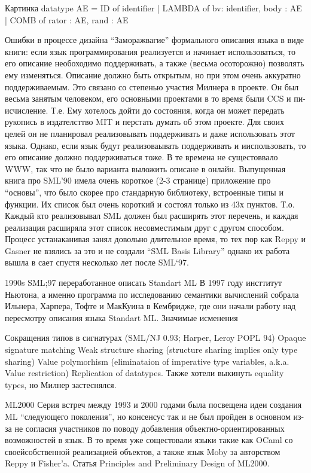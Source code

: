 \documentclass[14pt]{matmex-diploma-custom}
\begin{document}
Картинка
datatype AE = ID of identifier
            | LAMBDA of {bv: identifier, body : AE}
            | COMB of {rator : AE, rand : AE}

Ошибки в процессе дизайна
“Заморажвагие” формального описания языка в виде книги: если язык программирования реализуется и начинает использоваться, то его описание необоходимо поддерживать, а также (весьма осоторожно) позволять ему изменяться. Описание должно быть открытым, но при этом очень аккуратно поддерживаемым.
Это связано со степенью участия Милнера в проекте. Он был весьма занятым человеком, его основными проектами в то время были CCS и пи-исчисление. Т.е. Ему хотелось дойти до состояния, когда он может передать рукопись в издателсттво MIT  и перстать думать об этом проекте. Для своих целей он не планировал реализовывать поддерживать и даже использовать этот языка. Однако, если язык будут реализоваывать поддерживать и ииспользовать, то его описание должно поддерживаться тоже. В те времена не сущестоввало WWW, так что не было варианта выложить описане в онлайн.
Выпущенная книга про SML’90 имела очень короткое (2-3 странице) приложение про “основы”, что было скорее про стандарную библиотеку, встроенные типы и функции. Их список был очень короткий и состоял только из 43х пунктов. Т.о. Каждый кто реализовывал SML должен был расширять этот перечень, и каждая реализация расширяла этот список несовместимым друг с другом способом. Процесс устанаканивая занял довольно длительное время, то тех пор как Reppy и Gasner не взялись  за это и не создали “SML Basis Library” однако их работа вышла в сает спустя несколько лет после SML‘97.

1990s
SML;97 переработанное описать Standart ML
В 1997 году инсттитут Ньютона, а именно программа по исследованию семантики вычислений собрала Ильнера, Харпера, Тофте и МакКуина в Кембридже, где они начали работу над пересмотру описания языка Standart ML. Значимые исменения 


Сокращения типов в сигнатурах (SML/NJ 0.93; Harper, Leroy POPL 94)
Opaque signature matching
Weak structure sharing (structure sharing implies only type sharing) 
Value polymorhism (eliminataion of imperative type variables, a.k.a. Value restriction)
Replication of datatypes.
Также хотели выкинуть equality types, но Милнер застеснялся.

ML2000
Серия встреч между 1993 и 2000 годами была посвещена идеи создания ML “следующего поколения”,  но консенсус так и не был пройден в основном из-за не согласия участников по поводу добавления объектно-ориентированных возможностей в язык.
В то время уже сощестовали языки такие как OCaml со своейсобственной реализацией объектов, а также язык Moby за авторством Reppy и Fisher’a. 
Статья Principles and Preliminary Design of ML2000. 
\end{document}
